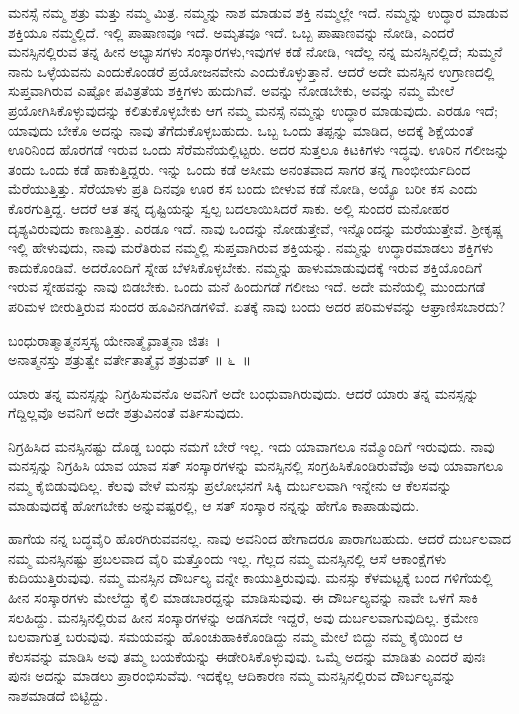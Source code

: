 ಮನಸ್ಸೆ ನಮ್ಮ ಶತ್ರು ಮತ್ತು ನಮ್ಮ ಮಿತ್ರ. ನಮ್ಮನ್ನು ನಾಶ ಮಾಡುವ ಶಕ್ತಿ ನಮ್ಮಲ್ಲೇ ಇದೆ. ನಮ್ಮನ್ನು ಉದ್ಧಾರ ಮಾಡುವ ಶಕ್ತಿಯೂ ನಮ್ಮಲ್ಲಿದೆ. ಇಲ್ಲಿ ಪಾಷಾಣವೂ ಇದೆ. ಅಮೃತವೂ ಇದೆ. ಒಬ್ಬ ಪಾಷಾಣವನ್ನು ನೋಡಿ, ಎಂದರೆ ಮನಸ್ಸಿನಲ್ಲಿರುವ ತನ್ನ ಹೀನ ಅಭ್ಯಾಸಗಳು ಸಂಸ್ಕಾರಗಳು,ಇವುಗಳ ಕಡೆ ನೋಡಿ, ಇದೆಲ್ಲ ನನ್ನ ಮನಸ್ಸಿನಲ್ಲಿದೆ; ಸುಮ್ಮನೆ ನಾನು ಒಳ್ಳೆಯವನು ಎಂದುಕೊಂಡರೆ ಪ್ರಯೋಜನವೇನು ಎಂದುಕೊಳ್ಳುತ್ತಾನೆ. ಆದರೆ ಅದೇ ಮನಸ್ಸಿನ ಉಗ್ರಾಣದಲ್ಲಿ ಸುಪ್ತವಾಗಿರುವ ಎಷ್ಟೋ ಪವಿತ್ರತೆಯ ಶಕ್ತಿಗಳು ಹುದುಗಿವೆ. ಅವನ್ನು ನೋಡಬೇಕು, ಅವನ್ನು ನಮ್ಮ ಮೇಲೆ ಪ್ರಯೋಗಿಸಿಕೊಳ್ಳುವುದನ್ನು ಕಲಿತುಕೊಳ್ಳಬೇಕು ಆಗ ನಮ್ಮ ಮನಸ್ಸೆ ನಮ್ಮನ್ನು ಉದ್ಧಾರ ಮಾಡುವುದು. ಎರಡೂ ಇದೆ; ಯಾವುದು ಬೇಕೊ ಅದನ್ನು ನಾವು ತೆಗೆದುಕೊಳ್ಳಬಹುದು. ಒಬ್ಬ ಒಂದು ತಪ್ಪನ್ನು ಮಾಡಿದ, ಅದಕ್ಕೆ ಶಿಕ್ಷೆಯಂತೆ ಊರಿನಿಂದ ಹೊರಗಡೆ ಇರುವ ಒಂದು ಸೆರೆಮನೆಯಲ್ಲಿಟ್ಟರು. ಅದರ ಸುತ್ತಲೂ ಕಿಟಕಿಗಳು ಇದ್ಧವು. ಊರಿನ ಗಲೀಜನ್ನು ತಂದು ಒಂದು ಕಡೆ ಹಾಕುತ್ತಿದ್ದರು. ಇನ್ನು ಒಂದು ಕಡೆ ಅಸೀಮ ಅನಂತವಾದ ಸಾಗರ ತನ್ನ ಗಾಂಭೀರ್ಯದಿಂದ ಮೆರೆಯುತ್ತಿತ್ತು. ಸೆರೆಯಾಳು ಪ್ರತಿ ದಿನವೂ ಊರ ಕಸ ಬಂದು ಬೀಳುವ ಕಡೆ ನೋಡಿ, ಅಯ್ಯೊ ಬರೀ ಕಸ ಎಂದು ಕೊರಗುತ್ತಿದ್ದ. ಆದರೆ ಆತ ತನ್ನ ದೃಷ್ಟಿಯನ್ನು ಸ್ವಲ್ಪ ಬದಲಾಯಿಸಿದರೆ ಸಾಕು. ಅಲ್ಲಿ ಸುಂದರ ಮನೋಹರ ದೃಶ್ಯವಿರುವುದು ಕಾಣುತ್ತಿತ್ತು. ಎರಡೂ ಇದೆ. ನಾವು ಒಂದನ್ನು ನೋಡುತ್ತೇವೆ, ಇನ್ನೊಂದನ್ನು ಮರೆಯುತ್ತೇವೆ. ಶ‍್ರೀಕೃಷ್ಣ ಇಲ್ಲಿ ಹೇಳುವುದು, ನಾವು ಮರೆತಿರುವ ನಮ್ಮಲ್ಲಿ ಸುಪ್ತವಾಗಿರುವ ಶಕ್ತಿಯನ್ನು. ನಮ್ಮನ್ನು ಉದ್ಧಾರಮಾಡಲು ಶಕ್ತಿಗಳು ಕಾದುಕೊಂಡಿವೆ. ಅದರೊಂದಿಗೆ ಸ್ನೇಹ ಬೆಳಸಿಕೊಳ್ಳಬೇಕು. ನಮ್ಮನ್ನು ಹಾಳುಮಾಡುವುದಕ್ಕೆ ಇರುವ ಶಕ್ತಿಯೊಂದಿಗೆ ಇರುವ ಸ್ನೇಹವನ್ನು ನಾವು ಬಿಡಬೇಕು. ಒಂದು ಮನೆ ಹಿಂದುಗಡೆ ಗಲೀಜು ಇದೆ. ಅದೇ ಮನೆಯಲ್ಲಿ ಮುಂದುಗಡೆ ಪರಿಮಳ ಬೀರುತ್ತಿರುವ ಸುಂದರ ಹೂವಿನ\break ಗಿಡಗಳಿವೆ. ಏತಕ್ಕೆ ನಾವು ಬಂದು ಅದರ ಪರಿಮಳವನ್ನು ಆಘ್ರಾಣಿಸಬಾರದು?

\begin{shloka}
ಬಂಧುರಾತ್ಮಾತ್ಮನಸ್ತಸ್ಯ ಯೇನಾತ್ಮೈವಾತ್ಮನಾ ಜಿತಃ~।\\ಅನಾತ್ಮನಸ್ತು ಶತ್ರುತ್ವೇ ವರ್ತೇತಾತ್ಮೈವ ಶತ್ರುವತ್ \hfill॥ ೬~॥
\end{shloka}

\begin{artha}
ಯಾರು ತನ್ನ ಮನಸ್ಸನ್ನು ನಿಗ್ರಹಿಸುವನೊ ಅವನಿಗೆ ಅದೇ ಬಂಧುವಾಗಿರುವುದು. ಆದರೆ ಯಾರು ತನ್ನ ಮನಸ್ಸನ್ನು ಗೆದ್ದಿಲ್ಲವೊ ಅವನಿಗೆ ಅದೇ ಶತ್ರುವಿನಂತೆ ವರ್ತಿಸುವುದು.
\end{artha}

ನಿಗ್ರಹಿಸಿದ ಮನಸ್ಸಿನಷ್ಟು ದೊಡ್ಡ ಬಂಧು ನಮಗೆ ಬೇರೆ ಇಲ್ಲ. ಇದು ಯಾವಾಗಲೂ ನಮ್ಮೊಂದಿಗೆ ಇರುವುದು. ನಾವು ಮನಸ್ಸನ್ನು ನಿಗ್ರಹಿಸಿ ಯಾವ ಯಾವ ಸತ್ ಸಂಸ್ಕಾರಗಳನ್ನು ಮನಸ್ಸಿನಲ್ಲಿ ಸಂಗ್ರಹಿಸಿಕೊಂಡಿರುವೆವೊ ಅವು ಯಾವಾಗಲೂ ನಮ್ಮ ಕೈಬಿಡುವುದಿಲ್ಲ. ಕೆಲವು ವೇಳೆ ಮನಸ್ಸು ಪ್ರಲೋಭನಗೆ ಸಿಕ್ಕಿ ದುರ್ಬಲವಾಗಿ ಇನ್ನೇನು ಆ ಕೆಲಸವನ್ನು ಮಾಡುವುದಕ್ಕೆ ಹೋಗಬೇಕು ಅನ್ನುವಷ್ಟರಲ್ಲಿ, ಆ ಸತ್ ಸಂಸ್ಕಾರ ನನ್ನನ್ನು ಹೇಗೊ ಕಾಪಾಡುವುದು.

ಹಾಗೆಯ ನನ್ನ ಬದ್ಧವೈರಿ ಹೊರಗಿರುವವನಲ್ಲ. ನಾವು ಅವನಿಂದ ಹೇಗಾದರೂ ಪಾರಾಗಬಹುದು. ಆದರೆ ದುರ್ಬಲವಾದ ನಮ್ಮ ಮನಸ್ಸಿನಷ್ಟು ಪ್ರಬಲವಾದ ವೈರಿ ಮತ್ತೊಂದು ಇಲ್ಲ. ಗೆಲ್ಲದ ನಮ್ಮ ಮನಸ್ಸಿನಲ್ಲಿ ಆಸೆ ಆಕಾಂಕ್ಷೆಗಳು ಕುದಿಯುತ್ತಿರುವುವು. ನಮ್ಮ ಮನಸ್ಸಿನ ದೌರ್ಬಲ್ಯ ವನ್ನೇ ಕಾಯುತ್ತಿರುವುವು. ಮನಸ್ಸು ಕೆಳಮಟ್ಟಕ್ಕೆ ಬಂದ ಗಳಿಗೆಯಲ್ಲಿ ಹೀನ ಸಂಸ್ಕಾರಗಳು ಮೇಲೆದ್ದು ಕೈಲಿ ಮಾಡಬಾರದ್ದನ್ನು ಮಾಡಿಸುವುವು. ಈ ದೌರ್ಬಲ್ಯವನ್ನು ನಾವೇ ಒಳಗೆ ಸಾಕಿ ಸಲಹಿದ್ದು. ಮನಸ್ಸಿನಲ್ಲಿರುವ ಹೀನ ಸಂಸ್ಕಾರಗಳನ್ನು ಅಡಗಿಸದೇ ಇದ್ದರೆ, ಅವು ದುರ್ಬಲವಾಗುವುದಿಲ್ಲ. ಕ್ರಮೇಣ ಬಲವಾಗುತ್ತ ಬರುವುವು. ಸಮಯವನ್ನು ಹೊಂಚುಹಾಕಿಕೊಂಡಿದ್ದು ನಮ್ಮ ಮೇಲೆ ಬಿದ್ದು ನಮ್ಮ ಕೈಯಿಂದ ಆ ಕೆಲಸವನ್ನು ಮಾಡಿಸಿ ಅವು ತಮ್ಮ ಬಯಕೆಯನ್ನು ಈಡೇರಿಸಿಕೊಳ್ಳುವುವು. ಒಮ್ಮೆ ಅದನ್ನು ಮಾಡಿತು ಎಂದರೆ ಪುನಃ ಪುನಃ ಅದನ್ನು ಮಾಡಲು ಪ್ರಾರಂಭಿಸುವೆವು. ಇದಕ್ಕೆಲ್ಲ ಆದಿಕಾರಣ ನಮ್ಮ ಮನಸ್ಸಿನಲ್ಲಿರುವ ದೌರ್ಬಲ್ಯವನ್ನು ನಾಶಮಾಡದೆ ಬಿಟ್ಟಿದ್ದು.

